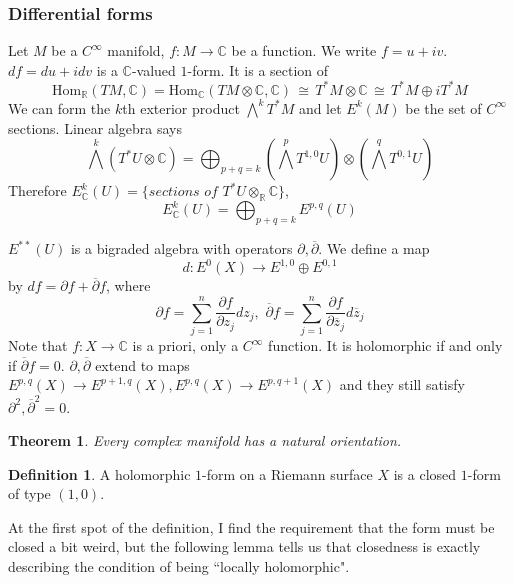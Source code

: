\documentclass[12pt]{article}
\theoremstyle{plain}
\newtheorem{theorem}[equation]{Theorem}
\theoremstyle{definition}
\newtheorem{definition}[equation]{Definition}
\newcommand{\IC}{\mathbb{C}}
\newcommand{\IR}{\mathbb{R}}
\newcommand{\Hom}{\mathrm{Hom}}
\newcommand\iso{{\, \cong \,}}
\newcommand\tensor{{\otimes}}
\newcommand{\<}{\langle}
\renewcommand{\>}{\rangle}
\newcommand{\bp}{\overline{\partial}}
\newcommand{\p}{\partial}
\newcommand{\bz}{\overline{z}}
\begin{document}
\subsubsection{Differential forms}
Let $M$ be a $C^\infty$ manifold, $f : M \to \IC$ be a function. We write $f = u + i v$. $df = du + i dv$ is a $\IC$-valued $1$-form. It is a section of
$$ \Hom_\IR (TM, \IC) = \Hom_\IC ( TM \tensor \IC, \IC) \iso T^* M \tensor \IC \iso T^* M \oplus i T^*M $$
We can form the $k$th exterior product $\bigwedge^k T^* M$ and let $E^k(M)$ be the set of $C^\infty$ sections. Linear algebra says 
$$ \bigwedge^k (T^* U \tensor \IC) = \bigoplus_{p + q = k} (\bigwedge^p T^{1,0} U) \tensor (\bigwedge^q T^{0, 1} U) $$ 
Therefore $E_\IC^k(U) = \{ \textit{sections of } T^* U \tensor_\IR \IC \}$, 
$$ E^k_\IC (U) = \bigoplus_{p + q = k} E^{p, q}(U) $$ 

$E^{**}(U)$ is a bigraded algebra with operators $\p, \bp$. We define a map 
$$ d : E^0(X) \to E^{1, 0} \oplus E^{0, 1} $$ by $df = \p f + \bp f$, where $$\p f = \sum_{j = 1}^n \frac{\p f}{\p z_j} dz_j, \, \, \bp f = \sum_{j = 1}^n \frac{\p f}{\p \bz_j} d\bz_j$$ Note that $f : X \to \IC$ is a priori, only a $C^\infty$ function. It is holomorphic if and only if $\bp f = 0$. $\p, \bp$ extend to maps $E^{p,q}(X) \to E^{p+1, q}(X), E^{p, q}(X) \to E^{p, q+1}(X)$ and they still satisfy $\p^2 , \bp^2 = 0$. 

\begin{theorem}
Every complex manifold has a natural orientation. 
\end{theorem}

\begin{definition}
A holomorphic $1$-form on a Riemann surface $X$ is a closed $1$-form of type $(1, 0)$. 
\end{definition}

At the first spot of the definition, I find the requirement that the form must be closed a bit weird, but the following lemma tells us that closedness is exactly describing the condition of being ``locally holomorphic". 
\end{document}
